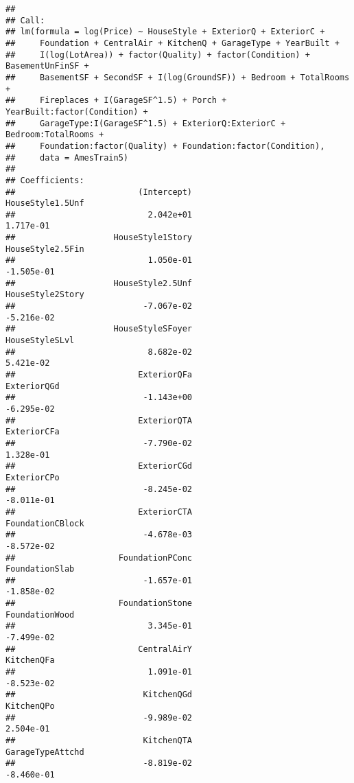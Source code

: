 \documentclass[
]{article}
\begin{document}
\begin{verbatim}
## 
## Call:
## lm(formula = log(Price) ~ HouseStyle + ExteriorQ + ExteriorC + 
##     Foundation + CentralAir + KitchenQ + GarageType + YearBuilt + 
##     I(log(LotArea)) + factor(Quality) + factor(Condition) + BasementUnFinSF + 
##     BasementSF + SecondSF + I(log(GroundSF)) + Bedroom + TotalRooms + 
##     Fireplaces + I(GarageSF^1.5) + Porch + YearBuilt:factor(Condition) + 
##     GarageType:I(GarageSF^1.5) + ExteriorQ:ExteriorC + Bedroom:TotalRooms + 
##     Foundation:factor(Quality) + Foundation:factor(Condition), 
##     data = AmesTrain5)
## 
## Coefficients:
##                         (Intercept)                     HouseStyle1.5Unf  
##                           2.042e+01                            1.717e-01  
##                    HouseStyle1Story                     HouseStyle2.5Fin  
##                           1.050e-01                           -1.505e-01  
##                    HouseStyle2.5Unf                     HouseStyle2Story  
##                          -7.067e-02                           -5.216e-02  
##                    HouseStyleSFoyer                       HouseStyleSLvl  
##                           8.682e-02                            5.421e-02  
##                         ExteriorQFa                          ExteriorQGd  
##                          -1.143e+00                           -6.295e-02  
##                         ExteriorQTA                          ExteriorCFa  
##                          -7.790e-02                            1.328e-01  
##                         ExteriorCGd                          ExteriorCPo  
##                          -8.245e-02                           -8.011e-01  
##                         ExteriorCTA                     FoundationCBlock  
##                          -4.678e-03                           -8.572e-02  
##                     FoundationPConc                       FoundationSlab  
##                          -1.657e-01                           -1.858e-02  
##                     FoundationStone                       FoundationWood  
##                           3.345e-01                           -7.499e-02  
##                         CentralAirY                           KitchenQFa  
##                           1.091e-01                           -8.523e-02  
##                          KitchenQGd                           KitchenQPo  
##                          -9.989e-02                            2.504e-01  
##                          KitchenQTA                     GarageTypeAttchd  
##                          -8.819e-02                           -8.460e-01  

\end{verbatim}
\end{document}
